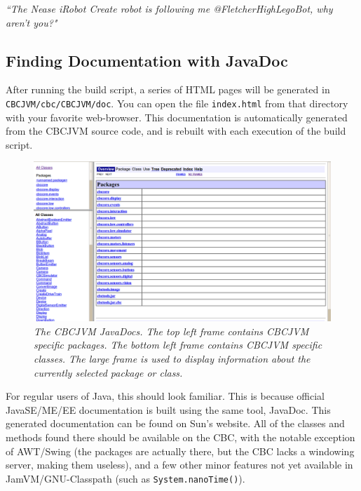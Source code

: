 \documentclass[12pt,letterpaper]{article}
\begin{document}
\textit{``The Nease iRobot Create robot is following me @FletcherHighLegoBot, why aren't you?"}



\subsection{Finding Documentation with JavaDoc}

After running the build script, a series of HTML pages will be generated in \texttt{CBCJVM/\-cbc/\-CBCJVM/\-doc}. You can open the file \texttt{index.html} from that directory with your favorite web-browser. This documentation is automatically generated from the CBCJVM source code, and is rebuilt with each execution of the build script.

\begin{figure}[h]
\includegraphics[width=\textwidth]{javadocs.png}
\caption{\textit{The CBCJVM JavaDocs. The top left frame contains CBCJVM specific packages. The bottom left frame contains CBCJVM specific classes. The large frame is used to display information about the currently selected package or class.}}
\end{figure}

For regular users of Java, this should look familiar. This is because official JavaSE/\-ME/\-EE documentation is built using the same tool, JavaDoc. This generated documentation can be found on Sun's website. All of the classes and methods found there should be available on the CBC, with the notable exception of AWT/\-Swing (the packages are actually there, but the CBC lacks a windowing server, making them useless), and a few other minor features not yet available in JamVM/\-GNU-Classpath (such as \texttt{System.\-nanoTime()}).
\end{document}
